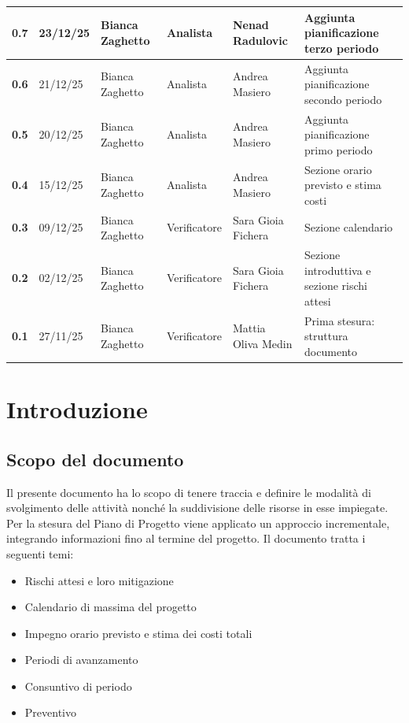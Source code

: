 \documentclass[a4paper,12pt]{article}
\begin{document}
\begin{xltabular}{\textwidth}{|l|l|X|l|X|X|}
\textbf{0.7} & 23/12/25 & Bianca Zaghetto & Analista & Nenad Radulovic & Aggiunta pianificazione terzo periodo \\
\hline
\textbf{0.6} & 21/12/25 & Bianca Zaghetto & Analista & Andrea Masiero & Aggiunta pianificazione secondo periodo \\
\hline
\textbf{0.5} & 20/12/25 & Bianca Zaghetto & Analista & Andrea Masiero & Aggiunta pianificazione primo periodo \\
\hline
\textbf{0.4} & 15/12/25 & Bianca Zaghetto & Analista & Andrea Masiero & Sezione orario previsto e stima costi \\
\hline
\textbf{0.3} & 09/12/25 & Bianca Zaghetto & Verificatore & Sara Gioia Fichera & Sezione calendario \\
\hline
\textbf{0.2} & 02/12/25 & Bianca Zaghetto & Verificatore & Sara Gioia Fichera & Sezione introduttiva e sezione rischi attesi \\
\hline
\textbf{0.1} & 27/11/25 & Bianca Zaghetto & Verificatore & Mattia Oliva Medin & Prima stesura: struttura documento \\
\hline
\end{xltabular}

\newpage
\tableofcontents

\newpage
\listoffigures

\newpage
\listoftables

\newpage

\section{Introduzione}
    \subsection{Scopo del documento}
        Il presente documento ha lo scopo di tenere traccia e definire le modalità di svolgimento delle attività nonché la suddivisione delle risorse in esse impiegate.
        Per la stesura del Piano di Progetto viene applicato un approccio incrementale, integrando informazioni fino al termine del progetto. Il documento tratta i seguenti temi:
        \begin{itemize}
            \item Rischi attesi e loro mitigazione
            \item Calendario di massima del progetto
            \item Impegno orario previsto e stima dei costi totali
            \item Periodi di avanzamento
            \item Consuntivo di periodo
            \item Preventivo
        \end{itemize}
\end{document}
